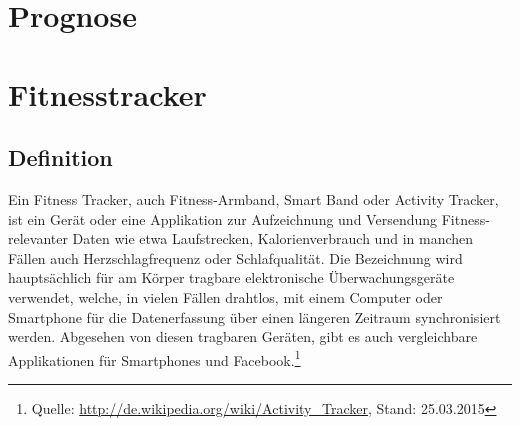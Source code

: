 \section{Prognose}
\section{Fitnesstracker}
\subsection{Definition}
Ein Fitness Tracker, auch Fitness-Armband, Smart Band oder Activity Tracker, ist ein Gerät oder eine Applikation zur Aufzeichnung und Versendung Fitness-relevanter Daten wie etwa Laufstrecken, Kalorienverbrauch und in manchen Fällen auch Herzschlagfrequenz oder Schlafqualität. Die Bezeichnung wird hauptsächlich für am Körper tragbare elektronische Überwachungsgeräte verwendet, welche, in vielen Fällen drahtlos, mit einem Computer oder Smartphone für die Datenerfassung über einen längeren Zeitraum synchronisiert werden. Abgesehen von diesen tragbaren Geräten, gibt es auch vergleichbare Applikationen für Smartphones und Facebook.\footnote{Quelle: \url{http://de.wikipedia.org/wiki/Activity\_Tracker}, Stand: 25.03.2015}

